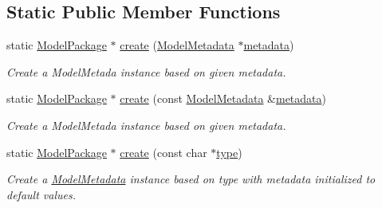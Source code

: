\subsection*{Static Public Member Functions}
\begin{DoxyCompactItemize}
\item 
static \hyperlink{classdg_1_1deepcore_1_1classification_1_1_model_package}{Model\+Package} $\ast$ \hyperlink{group___classification_module_ga0c294e3def7dceac4acb48b191ee6df0}{create} (\hyperlink{classdg_1_1deepcore_1_1classification_1_1_model_metadata}{Model\+Metadata} $\ast$\hyperlink{group___classification_module_gaa88957807aa9cd63108033b376e60ef2}{metadata})
\begin{DoxyCompactList}\small\item\em Create a Model\+Metada instance based on given metadata. \end{DoxyCompactList}\item 
static \hyperlink{classdg_1_1deepcore_1_1classification_1_1_model_package}{Model\+Package} $\ast$ \hyperlink{group___classification_module_gaa4bb1ba1156829db5249f2583da252d6}{create} (const \hyperlink{classdg_1_1deepcore_1_1classification_1_1_model_metadata}{Model\+Metadata} \&\hyperlink{group___classification_module_gaa88957807aa9cd63108033b376e60ef2}{metadata})
\begin{DoxyCompactList}\small\item\em Create a Model\+Metada instance based on given metadata. \end{DoxyCompactList}\item 
static \hyperlink{classdg_1_1deepcore_1_1classification_1_1_model_package}{Model\+Package} $\ast$ \hyperlink{group___classification_module_ga37d9fd1a7c8847139c5e6663c258f377}{create} (const char $\ast$\hyperlink{group___classification_module_ga9f09bd24a91c366c473b9fbb9a59b64a}{type})
\begin{DoxyCompactList}\small\item\em Create a \hyperlink{classdg_1_1deepcore_1_1classification_1_1_model_metadata}{Model\+Metadata} instance based on type with metadata initialized to default values. \end{DoxyCompactList}\end{DoxyCompactItemize}
